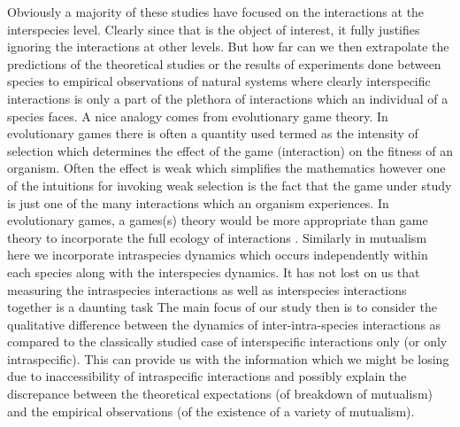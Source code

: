 \documentclass[12pt]{article}
\begin{document}
Obviously a majority of these studies have focused on the interactions at the interspecies level.
Clearly since that is the object of interest, it fully justifies ignoring the interactions at other levels.
But how far can we then extrapolate the predictions of the theoretical studies or the results of experiments done between species to empirical observations of natural systems where clearly interspecific interactions is only a part of the plethora of interactions which an individual of a species faces.
A nice analogy comes from evolutionary game theory.
In evolutionary games there is often a quantity used termed as the intensity of selection which determines the effect of the game (interaction) on the fitness of an organism. 
Often the effect is weak which simplifies the mathematics however one of the intuitions for invoking weak selection is the fact that the game under study is just one of the many interactions which an organism experiences.
In evolutionary games, a games(s) theory would be more appropriate than game theory to incorporate the full ecology of interactions \citep{bednar:RS:2007}.
Similarly in mutualism here we incorporate intraspecies dynamics which occurs independently within each species along with the interspecies dynamics.
It has not lost on us that measuring the intraspecies interactions as well as interspecies interactions together is a daunting task \citep{behm:JE:2014}
The main focus of our study then is to consider the qualitative difference between the dynamics of inter-intra-species interactions as compared to the classically studied case of interspecific interactions only (or only intraspecific).
This can provide us with the information which we might be losing due to inaccessibility of intraspecific interactions and possibly explain the discrepance between the theoretical expectations (of breakdown of mutualism) and the empirical observations (of the existence of a  variety of mutualism).
\end{document}
